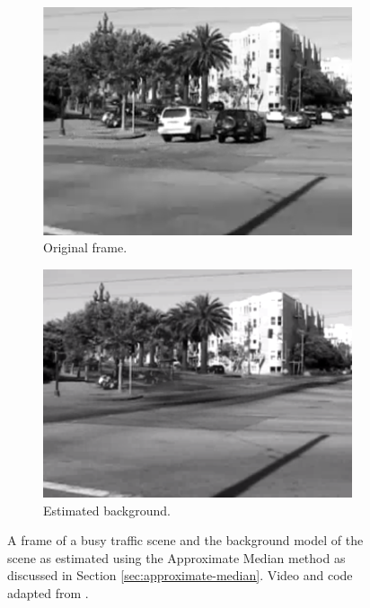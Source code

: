 \begin{figure}[h]
  \centering
  \begin{subfigure}[b]{0.4\textwidth}
                \centering
                \includegraphics[width=\textwidth]{sethactual}
                \caption{Original frame.}
                \label{fig:bgbw}
        \end{subfigure}
\quad
\begin{subfigure}[b]{0.4\textwidth}
                \centering
                \includegraphics[width=\textwidth]{sethbgm}
                \caption{Estimated background.}
                \label{fig:bgbg}
        \end{subfigure}
\caption{A frame of a busy traffic scene and the background model of the scene as estimated using the Approximate Median method as discussed in Section \ref{sec:approximate-median}. Video and code adapted from \cite{benton2008background}. \label{fig:bg}}
\end{figure}

